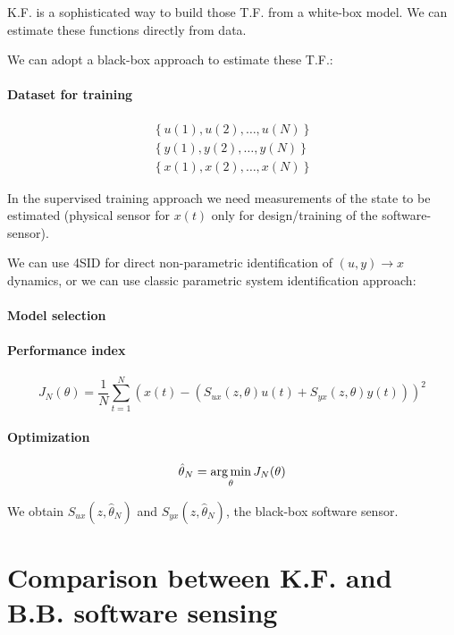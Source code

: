 
K.F. is a sophisticated way to build those T.F. from a white-box model.
We can estimate these functions directly from data.

We can adopt a black-box approach to estimate these T.F.:

\paragraph{Dataset for training}
\begin{align*}
    \left\{ u(1), u(2), \ldots, u(N) \right\} \\
    \left\{ y(1), y(2), \ldots, y(N) \right\} \\
    \left\{ x(1), x(2), \ldots, x(N) \right\}
\end{align*}

In the supervised training approach we need measurements of the state to be estimated (physical sensor for $x(t)$ only for design/training of the software-sensor).

We can use 4SID for direct non-parametric identification of $(u,y)\rightarrow x$ dynamics, or we can use classic parametric system identification approach:

\paragraph{Model selection} \phantom{lol}


\paragraph{Performance index}
\[
    J_N(\theta) = \frac{1}{N}\sum_{t=1}^N \left( x(t) - (S_{ux}(z, \theta) u(t) + S_{yx}(z,\theta)y(t)) \right)^2
\]

\paragraph{Optimization}
\[
    \hat{\theta}_N = \operatorname*{arg\,min}_\theta J_N(\theta)
\]

We obtain $S_{ux}(z, \hat{\theta}_N)$ and $S_{yx}(z, \hat{\theta}_N)$, the black-box software sensor.

\section{Comparison between K.F. and B.B. software sensing}

